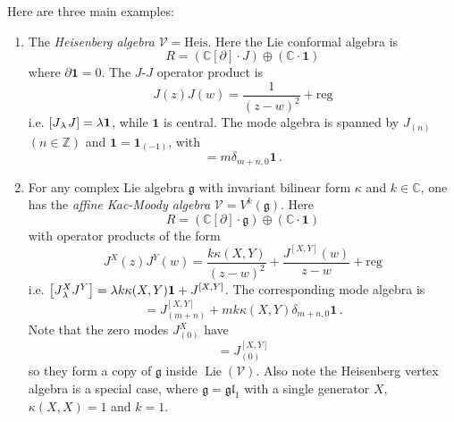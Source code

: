 \documentclass[12pt,letterpaper,reqno]{amsart}
\numberwithin{equation}{section}
\newcommand{\fg}{{\mathfrak g}}
\newcommand{\fgl}{{\mathfrak {gl}}}
\newcommand{\Heis}{{\mathrm{Heis}}}
\newcommand{\bbC}{\ensuremath{\mathbb C}}
\newcommand{\bbZ}{\ensuremath{\mathbb Z}}
\newcommand{\regular}{{\mathrm{reg}}}
\newcommand{\lb}[3]{\left[#1_{\mkern2mu #2 \mkern2mu} #3\right]}
\newcommand\bid{{\mathbf 1}}
\newcommand{\vertex}{\mathcal{V}}
\newcommand{\ti}[1]{\textit{#1}}
\DeclareMathOperator{\Lie}{Lie}
\begin{document}
Here are three main examples: 
\begin{enumerate}
\item The \ti{Heisenberg algebra} $\vertex = \Heis$. 
Here the Lie conformal algebra is
\begin{equation}
  R = (\bbC[\partial] \cdot J) \oplus (\bbC \cdot \bid)
\end{equation}
where $\partial \bid = 0$.
The $J$-$J$ operator product is
\begin{equation}
 J(z) J(w) = \frac{1}{(z-w)^2} + \regular
\end{equation}
i.e. $\lb{J}{\lambda}{J} = \lambda \bid$, while $\bid$ is central.
The mode algebra is spanned by $J_{(n)}$ $(n \in \bbZ)$ and $\bid = \bid_{(-1)}$, with
\begin{equation}
[J_{(m)},J_{(n)}] = m \delta_{m+n,0} \bid \, .
\end{equation}


\item For any complex Lie algebra $\fg$ with invariant bilinear form $\kappa$ and $k \in \bbC$, 
one has the \ti{affine Kac-Moody algebra} $\vertex = V^k(\fg)$.
Here
\begin{equation}
  R = (\bbC[\partial] \cdot \fg) \oplus (\bbC \cdot \bid)
\end{equation}
with operator products of the form
\begin{equation} \label{eq:kac-moody-ope}
  J^X(z) J^Y(w) = \frac{k \kappa(X,Y)}{(z-w)^2} + \frac{J^{[X,Y]}(w)}{z-w} + \regular
\end{equation}
i.e. $\lb{J^X}{\lambda}{J^Y} = \lambda k \kappa(X,Y) \bid + J^{[X,Y]}$.
The corresponding mode algebra is
\begin{equation}
[J^X_{(m)},J^Y_{(n)}] = J^{[X,Y]}_{(m+n)} + m k \kappa(X,Y) \delta_{m+n,0} \bid \, .
\end{equation}
Note that the zero modes $J^X_{(0)}$ have 
\begin{equation}
  [J^X_{(0)}, J^Y_{(0)}] = J^{[X,Y]}_{(0)}
\end{equation}
so they form a copy of $\fg$ inside $\Lie(\vertex)$.
Also note the Heisenberg vertex algebra is a special case, where $\fg = \fgl_1$ with a single generator $X$,
$\kappa(X,X) = 1$ and $k=1$.


\end{enumerate}
\end{document}
